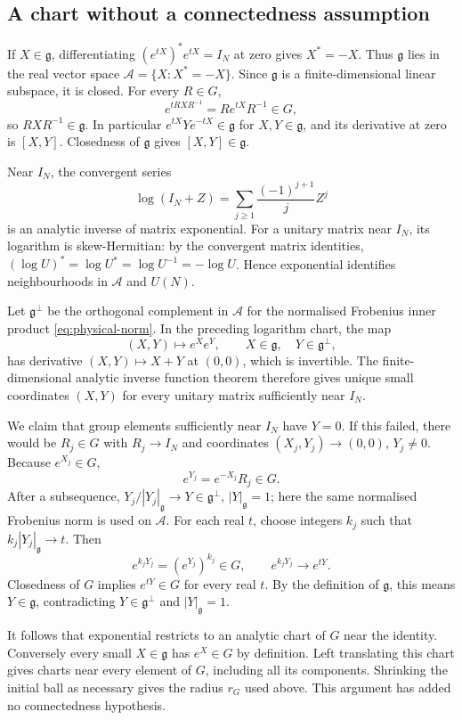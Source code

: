 \documentclass[11pt,reqno]{amsart}
\numberwithin{equation}{section}
\theoremstyle{definition}
\theoremstyle{remark}
\newcommand{\g}{\mathfrak g}
\begin{document}
\subsection{A chart without a connectedness assumption}

If \(X\in\g\), differentiating
\((e^{tX})^*e^{tX}=I_N\) at zero gives \(X^*=-X\).
Thus \(\g\) lies in the real vector space
\(\mathcal A=\{X:X^*=-X\}\). Since \(\g\) is a finite-dimensional
linear subspace, it is closed. For every \(R\in G\),
\[
               e^{tRXR^{-1}}=Re^{tX}R^{-1}\in G,
\]
so \(RXR^{-1}\in\g\). In particular
\(e^{tX}Ye^{-tX}\in\g\) for \(X,Y\in\g\), and its derivative
at zero is \([X,Y]\). Closedness of \(\g\) gives
\([X,Y]\in\g\).

Near \(I_N\), the convergent series
\[
              \log(I_N+Z)=\sum_{j\ge1}\frac{(-1)^{j+1}}j Z^j
\]
is an analytic inverse of matrix exponential. For a unitary matrix
near \(I_N\), its logarithm is skew-Hermitian: by the convergent
matrix identities, \((\log U)^*=\log U^*=\log U^{-1}=-\log U\).
Hence exponential identifies neighbourhoods in \(\mathcal A\)
and \(U(N)\).

Let \(\g^\perp\) be the orthogonal complement in \(\mathcal A\)
for the normalised Frobenius inner product
\eqref{eq:physical-norm}. In the preceding logarithm chart,
the map
\[
       (X,Y)\longmapsto e^Xe^Y,
       \qquad X\in\g,\quad Y\in\g^\perp,
\]
has derivative \((X,Y)\mapsto X+Y\) at \((0,0)\), which is
invertible. The finite-dimensional analytic inverse function
theorem therefore gives unique small coordinates \((X,Y)\) for
every unitary matrix sufficiently near \(I_N\).

We claim that group elements sufficiently near \(I_N\) have
\(Y=0\). If this failed, there would be \(R_j\in G\) with
\(R_j\to I_N\) and coordinates \((X_j,Y_j)\to(0,0)\),
\(Y_j\ne0\). Because \(e^{X_j}\in G\),
\[
                          e^{Y_j}=e^{-X_j}R_j\in G.
\]
After a subsequence,
\(Y_j/|Y_j|_{\g}\to Y\in\g^\perp\), \(|Y|_{\g}=1\);
here the same normalised Frobenius norm is used on \(\mathcal A\).
For each real \(t\), choose integers \(k_j\) such that
\(k_j|Y_j|_{\g}\to t\). Then
\[
                e^{k_jY_j}=(e^{Y_j})^{k_j}\in G,
                \qquad e^{k_jY_j}\longrightarrow e^{tY}.
\]
Closedness of \(G\) implies \(e^{tY}\in G\) for every real \(t\).
By the definition of \(\g\), this means \(Y\in\g\), contradicting
\(Y\in\g^\perp\) and \(|Y|_{\g}=1\).

It follows that exponential restricts to an analytic chart of \(G\)
near the identity. Conversely every small \(X\in\g\) has
\(e^X\in G\) by definition. Left translating this chart gives
charts near every element of \(G\), including all its components.
Shrinking the initial ball as necessary gives the radius \(r_G\)
used above. This argument has added no connectedness hypothesis.
\end{document}
